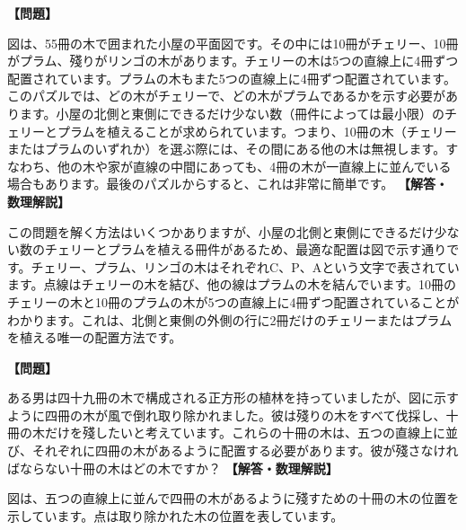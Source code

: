 \documentclass[10pt,a4paper,oneside,openany]{ltjsbook}
\begin{document}
\begin{tcolorbox}[colback=softblue,colframe=primaryblue,title=\textbf{第 207 問：チェリーとプラム （原題: CHERRIES AND PLUMS.）},arc=2mm,boxrule=1pt,breakable]
\textbf{【問題】}\par\vspace{0.3em}
図は、55冊の木で囲まれた小屋の平面図です。その中には10冊がチェリー、10冊がプラム、殘りがリンゴの木があります。チェリーの木は5つの直線上に4冊ずつ配置されています。プラムの木もまた5つの直線上に4冊ずつ配置されています。このパズルでは、どの木がチェリーで、どの木がプラムであるかを示す必要があります。小屋の北側と東側にできるだけ少ない数（冊件によっては最小限）のチェリーとプラムを植えることが求められています。つまり、10冊の木（チェリーまたはプラムのいずれか）を選ぶ際には、その間にある他の木は無視します。すなわち、他の木や家が直線の中間にあっても、4冊の木が一直線上に並んでいる場合もあります。最後のパズルからすると、これは非常に簡単です。
\tcblower
\textbf{【解答・数理解説】}\par\vspace{0.3em}
この問題を解く方法はいくつかありますが、小屋の北側と東側にできるだけ少ない数のチェリーとプラムを植える冊件があるため、最適な配置は図で示す通りです。チェリー、プラム、リンゴの木はそれぞれC、P、Aという文字で表されています。点線はチェリーの木を結び、他の線はプラムの木を結んでいます。10冊のチェリーの木と10冊のプラムの木が5つの直線上に4冊ずつ配置されていることがわかります。これは、北側と東側の外側の行に2冊だけのチェリーまたはプラムを植える唯一の配置方法です。
\end{tcolorbox}

\begin{tcolorbox}[colback=softblue,colframe=primaryblue,title=\textbf{第 208 問：植林のパズル （原題: A PLANTATION PUZZLE.）},arc=2mm,boxrule=1pt,breakable]
\textbf{【問題】}\par\vspace{0.3em}
ある男は四十九冊の木で構成される正方形の植林を持っていましたが、図に示すように四冊の木が風で倒れ取り除かれました。彼は殘りの木をすべて伐採し、十冊の木だけを殘したいと考えています。これらの十冊の木は、五つの直線上に並び、それぞれに四冊の木があるように配置する必要があります。彼が殘さなければならない十冊の木はどの木ですか？
\tcblower
\textbf{【解答・数理解説】}\par\vspace{0.3em}
図は、五つの直線上に並んで四冊の木があるように殘すための十冊の木の位置を示しています。点は取り除かれた木の位置を表しています。
\end{tcolorbox}
\end{document}
